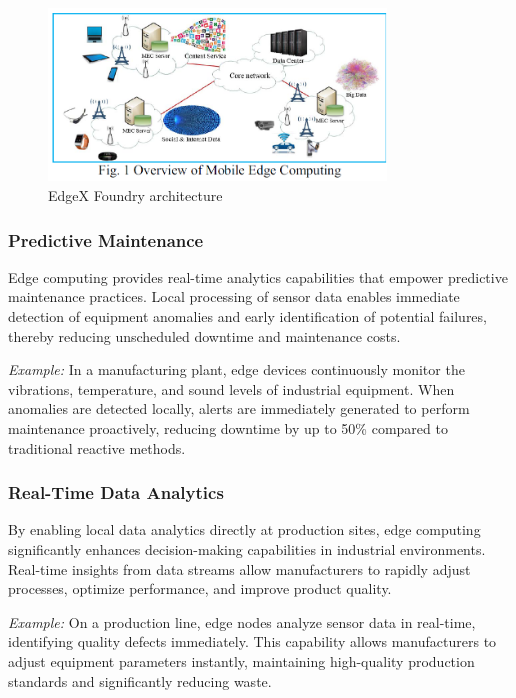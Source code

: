 \documentclass[runningheads]{llncs}
\begin{document}
\begin{figure}[ht]
    \centering
    \includegraphics[width=0.8\textwidth]{IMG/4.png}
    \caption{EdgeX Foundry architecture}
    \label{fig:edgex_architecture}
    \end{figure}

\subsubsection{Predictive Maintenance}
Edge computing provides real-time analytics capabilities that empower predictive maintenance practices. Local processing of sensor data enables immediate detection of equipment anomalies and early identification of potential failures, thereby reducing unscheduled downtime and maintenance costs.

\textit{Example:} In a manufacturing plant, edge devices continuously monitor the vibrations, temperature, and sound levels of industrial equipment. When anomalies are detected locally, alerts are immediately generated to perform maintenance proactively, reducing downtime by up to 50\% compared to traditional reactive methods.

\subsubsection{Real-Time Data Analytics}
By enabling local data analytics directly at production sites, edge computing significantly enhances decision-making capabilities in industrial environments. Real-time insights from data streams allow manufacturers to rapidly adjust processes, optimize performance, and improve product quality.

\textit{Example:} On a production line, edge nodes analyze sensor data in real-time, identifying quality defects immediately. This capability allows manufacturers to adjust equipment parameters instantly, maintaining high-quality production standards and significantly reducing waste.
\end{document}
